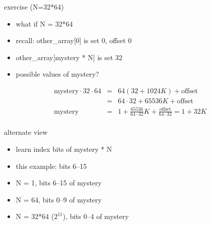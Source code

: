 \begin{frame}{exercise (N=32*64)}
    \begin{itemize}
    \item what if N = 32*64
    \item recall: other\_array[0] is set 0, offset 0
    \item other\_array[mystery * N] is set 32
    \item possible values of mystery?
    \end{itemize}
\vspace{-.5cm}
\begin{eqnarray*}
\text{mystery}\cdot 32\cdot 64 & = & 64(32+1024K) + \text{offset} \\
        & = & 64\cdot32 + 65536K + \text{offset}\\
\text{mystery} & = & 1 + \frac{65536}{64\cdot32}K + \frac{\text{offset}}{64\cdot32} = 1+32K \\
\end{eqnarray*}
\end{frame}

\begin{frame}{alternate view}
    \begin{itemize}
    \item learn index bits of mystery * N
    \item this example: bits 6--15
    \vspace{.5cm}
    \item N = 1, bits 6--15 of mystery
    \item N = 64, bits 0--9 of mystery
    \item N = 32*64 ($2^{11}$), bits 0--4 of mystery
    \end{itemize}
\end{frame}
